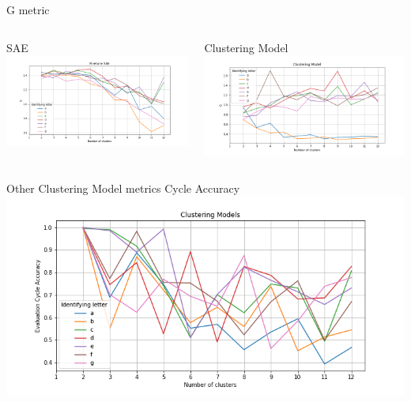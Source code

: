 \documentclass{beamer}
\begin{document}
\begin{frame}{G metric}
\begin{minipage}[\textheight]{\textwidth}
\begin{columns}[T]
	\begin{column}{0.6\textwidth}
	SAE
	\centering
	\includegraphics[width=\textwidth, keepaspectratio]{./images/Finetune_SAE_G_metric.png}
	\end{column}
	\begin{column}{0.6\textwidth}
	Clustering Model
	\centering
	\includegraphics[width=\textwidth, keepaspectratio]{./images/Clustering_Model_G_metric.png}
	\end{column}
\end{columns}
\end{minipage}
\end{frame}

\begin{frame}{Other Clustering Model metrics}
	Cycle Accuracy
	\centering
	\includegraphics[width=\textwidth, keepaspectratio]{./images/clustering_cycle_acc_metric.png}
\end{frame}
\end{document}

